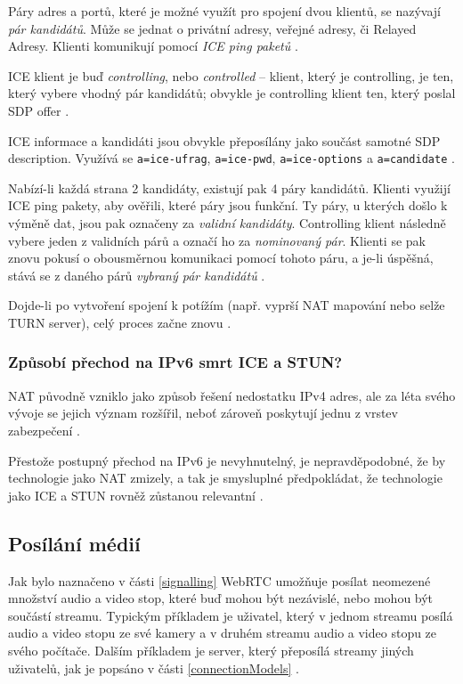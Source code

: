 Páry adres a portů, které je možné využít pro spojení dvou klientů, se nazývají
\textit{pár kandidátů}. Může se jednat o privátní adresy, veřejné adresy, či
Relayed Adresy. Klienti komunikují pomocí \textit{ICE ping paketů}
\cite{WebRTCForTheCurious}.

ICE klient je buď \textit{controlling}, nebo \textit{controlled} -- klient,
který je controlling, je ten, který vybere vhodný pár kandidátů; obvykle je
controlling klient ten, který poslal SDP offer \cite{WebRTCForTheCurious}.

ICE informace a kandidáti jsou obvykle přeposílány jako součást samotné SDP
description. Využívá se \texttt{a=ice-ufrag},
\texttt{a=ice-pwd}, \texttt{a=ice-options} a
\texttt{a=candidate} \cite{WebRTCForTheCurious}.

Nabízí-li každá strana 2 kandidáty, existují pak 4 páry kandidátů. Klienti
využijí ICE ping pakety, aby ověřili, které páry jsou funkční. Ty páry, u
kterých došlo k výměně dat, jsou pak označeny za \textit{validní kandidáty}.
Controlling klient následně vybere jeden z validních párů a označí ho za
\textit{nominovaný pár}. Klienti se pak znovu pokusí o obousměrnou komunikaci
pomocí tohoto páru, a je-li úspěšná, stává se z daného párů \textit{vybraný pár
	kandidátů} \cite{WebRTCForTheCurious}.

Dojde-li po vytvoření spojení k potížím (např. vyprší NAT mapování nebo selže
TURN server), celý proces začne znovu \cite{WebRTCForTheCurious}.

\subsubsection{Způsobí přechod na IPv6 smrt ICE a STUN?}

NAT původně vzniklo jako způsob řešení nedostatku IPv4 adres, ale za léta svého
vývoje se jejich význam rozšířil, neboť zároveň poskytují jednu z vrstev
zabezpečení \cite{Quora-WillIPv6KillSTUNAndICE}.

Přestože postupný přechod na IPv6 je nevyhnutelný, je nepravděpodobné, že by
technologie jako NAT zmizely, a tak je smysluplné předpokládat, že technologie
jako ICE a STUN rovněž zůstanou relevantní \cite{Quora-WillIPv6KillSTUNAndICE}.

\subsection{Posílání médií}

Jak bylo naznačeno v části \ref{signalling} WebRTC umožňuje posílat neomezené
množství audio a video stop, které buď mohou být nezávislé, nebo mohou být
součástí streamu. Typickým příkladem je uživatel, který v jednom streamu posílá
audio a video stopu ze své kamery a v druhém streamu audio a video stopu ze
svého počítače. Dalším příkladem je server, který přeposílá streamy jiných
uživatelů, jak je popsáno v části \ref{connectionModels}
\cite{WebRTCForTheCurious}.

